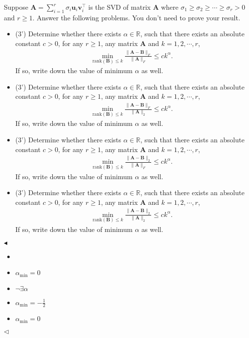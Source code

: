 \documentclass[11pt]{article}
\newenvironment{problem}[2][Problem]{\begin{trivlist}
\item[\hskip \labelsep {\bfseries #1}\hskip \labelsep {\bfseries #2.}]}{\hfill$\blacktriangleleft$\end{trivlist}}
\newenvironment{answer}[1][Answer]{\begin{trivlist}
\item[\hskip \labelsep {\bfseries #1.}\hskip \labelsep]}{\hfill$\lhd$\end{trivlist}}
\begin{document}
\begin{problem}{2 (12')} Suppose $\bm A=\sum_{i=1}^r \sigma_i \bm u_i \bm v_i^\top$ is the SVD of matrix $\bm A$ where $\sigma_1\geq\sigma_2\geq\cdots\geq\sigma_r>0$ and $r\geq 1$. Answer the following problems. You don't need to prove your result.
    \begin{itemize}
        \item [(1)] (3') Determine whether there exists $\alpha\in\mathbb{R}$, such that there exists an absolute constant $c>0$, for any $r\geq 1$, any matrix $\bm A$ and $k=1,2,\cdots,r$,
        \begin{align*}
            \min_{\mathrm{rank}(\bm B)\leq k}\frac{\|\bm A-\bm B\|_F}{\|\bm A\|_F}\leq ck^\alpha.
        \end{align*}
        If so, write down the value of minimum $\alpha$ as well.
        \item [(2)] (3') Determine whether there exists $\alpha\in\mathbb{R}$, such that there exists an absolute constant $c>0$, for any $r\geq 1$, any matrix $\bm A$ and $k=1,2,\cdots,r$,
        \begin{align*}
            \min_{\mathrm{rank}(\bm B)\leq k}\frac{\|\bm A-\bm B\|_F}{\|\bm A\|_2}\leq ck^\alpha.
        \end{align*}
        If so, write down the value of minimum $\alpha$ as well.
        \item [(3)] (3') Determine whether there exists $\alpha\in\mathbb{R}$, such that there exists an absolute constant $c>0$, for any $r\geq 1$, any matrix $\bm A$ and $k=1,2,\cdots,r$,
        \begin{align*}
            \min_{\mathrm{rank}(\bm B)\leq k}\frac{\|\bm A-\bm B\|_2}{\|\bm A\|_F}\leq ck^\alpha.
        \end{align*}
        If so, write down the value of minimum $\alpha$ as well.
        \item [(4)] (3') Determine whether there exists $\alpha\in\mathbb{R}$, such that there exists an absolute constant $c>0$, for any $r\geq 1$, any matrix $\bm A$ and $k=1,2,\cdots,r$,
        \begin{align*}
            \min_{\mathrm{rank}(\bm B)\leq k}\frac{\|\bm A-\bm B\|_2}{\|\bm A\|_2}\leq ck^\alpha.
        \end{align*}
        If so, write down the value of minimum $\alpha$ as well.
    \end{itemize}
\end{problem}
\begin{answer}
    \begin{itemize}
        \item
        \item [(1)] $\alpha_{\min}=0$
        \item [(2)] $\neg \exists \alpha$
        \item [(3)] $\alpha_{\min}=-\frac{1}{2}$
        \item [(4)] $\alpha_{\min}=0$
    \end{itemize}
\end{answer}
\end{document}
